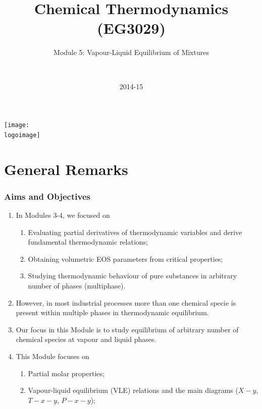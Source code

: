 \documentclass[10pt,compress]{beamer}
\institute{School of Engineering}
\title{Chemical Thermodynamics (EG3029)}
\subtitle{Module 5: Vapour-Liquid Equilibrium of Mixtures}
\date[2014-15]{2014-15}
\author[\shortname]{%
  \fullname\\\ttfamily{\emailaddress}
}
\newcommand{\logoimage}{../../FigBanner/UoAHorizBanner}
\begin{document}
\begin{frame}
  \titlepage
  \vfill%
  \begin{center}
    \texttt{[image: \\logoimage]}
  \end{center}
\end{frame}




\section{General Remarks}

\begin{frame}
 \frametitle{Aims and Objectives}
   \begin{enumerate}
     \item<1-> In Modules 3-4, we focused on 
       \begin{enumerate}
         \item<1-> Evaluating partial derivatives of thermodynamic variables and derive fundamental thermodynamic relations;
         \item<1-> Obtaining volumetric EOS parameters from critical properties;
         \item<1-> Studying thermodynamic behaviour of pure substances in arbitrary number of phases (multiphase).
       \end{enumerate} 
     \item<2-> However, in most industrial processes more than one chemical specie is present within multiple phases in thermodynamic equilibrium. 
     \item<3-> Our focus in this Module is to study equilibrium of arbitrary number of chemical species at vapour and liquid phases.
     \item<4-> This Module focuses on 
         \begin{enumerate}
           \item<4-> Partial molar properties; 
           \item<4-> Vapour-liquid equilibrium (VLE) relations and the main diagrams ($X-y$, $T-x-y$, $P-x-y$); 
         \end{enumerate}
   \end{enumerate}
\end{frame}
\end{document}
